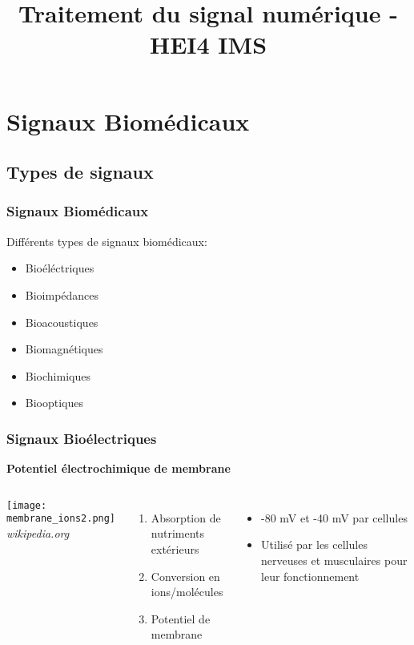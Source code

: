 \documentclass{beamer}
\title[Traitement du signal numérique]{Traitement du signal numérique - HEI4 IMS}
\author[Antony Bazir]{}
\begin{document}
\section{Signaux Biomédicaux}
\subsection{Types de signaux}
\begin{frame}
\frametitle{Signaux Biomédicaux}
Différents types de signaux biomédicaux: \\
\vspace{0.3cm}
\begin{itemize}
\item<2-> Bioéléctriques
\vspace{0.2cm}
\item<3-> Bioimpédances
\vspace{0.2cm}
\item<4-> Bioacoustiques
\vspace{0.2cm}
\item<5-> Biomagnétiques
\vspace{0.2cm}
\item<6-> Biochimiques
\vspace{0.2cm}
\item<7-> Biooptiques
\end{itemize}
\end{frame}

\begin{frame}
\frametitle{Signaux Bioélectriques}
\textbf{Potentiel électrochimique de membrane}
\begin{columns}
\column{60mm}
 \texttt{[image: membrane\_ions2.png]}
 \footnotesize \textit{wikipedia.org}
\column{60mm}
\begin{enumerate}
\item Absorption de nutriments extérieurs
\vspace{0.3cm}
\item Conversion en ions/molécules
\vspace{0.3cm}
\item Potentiel de membrane
\end{enumerate}
\vspace{0.4cm}
\begin{itemize}
\item -80 mV et -40 mV par cellules
\vspace{0.2cm}
\item Utilisé par les cellules nerveuses et musculaires pour leur fonctionnement
\end{itemize}
\end{columns}
\end{frame}
\end{document}

